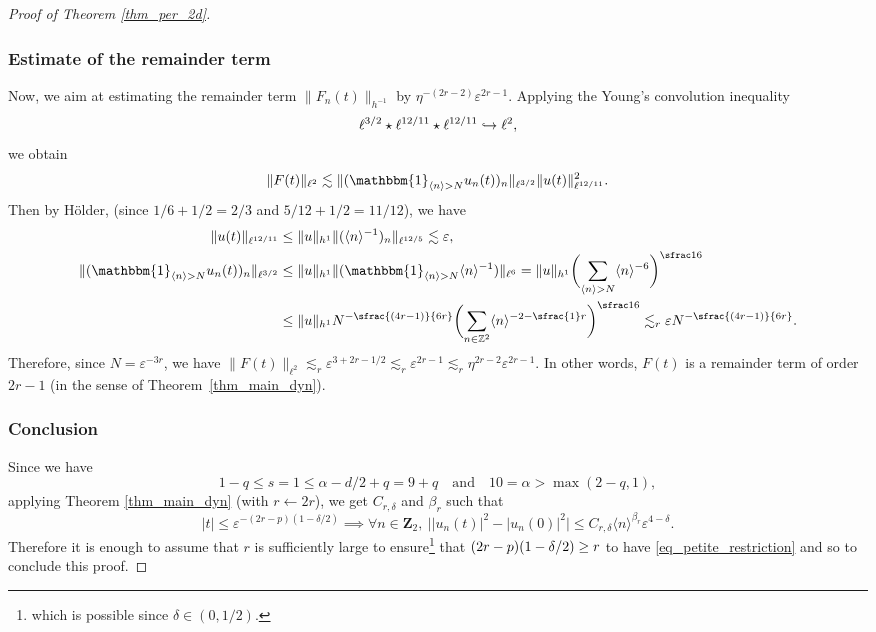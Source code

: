 \documentclass[JEP,XML,SOM,Unicode,NoEqCountersInSection,published]{cedram}
\newcommand\hto{\mathrel{\lhook\joinrel\to}}
\newcommand{\psfrac}[2]{\sfrac{(#1)}{#2}}
\theoremstyle{definition}
\begin{document}
\begin{proof}[Proof of Theorem \ref{thm_per_2d}]
\subsubsection*{Estimate of the remainder term}
Now, we aim at estimating the remainder term $\|F_n(t)\|_{h^{-1}}$ by $\eta^{-(2r-2)} \varepsilon^{ 2r-1}$. Applying the Young's convolution inequality
\[
\ell^{3/2} \star \ell^{12/11} \star \ell^{12/11} \hto \ell^2,
\]
we obtain
\[
\| F(t)\|_{\ell^2}\lesssim \| (\mathbbm{1}_{\langle n \rangle > N} u_n(t))_n \|_{\ell^{3/2}} \| u(t) \|_{\ell^{12/11}}^2.
\]
Then by Hölder, (since $1/6+1/2=2/3$ and $5/12 + 1/2= 11/12$), we have
\begin{align*}
\| u(t) \|_{\ell^{12/11}} &\leq \|u\|_{h^1} \| (\langle n \rangle^{-1})_n \|_{\ell^{12/5}} \lesssim \varepsilon,
\\
\| (\mathbbm{1}_{\langle n \rangle > N} u_n(t))_n \|_{\ell^{3/2}} &\leq \|u\|_{h^1} \| (\mathbbm{1}_{\langle n \rangle > N} \langle n \rangle^{-1}) \|_{\ell^6} = \|u\|_{h^1} \biggl(\sum_{ \langle n \rangle > N } \langle n \rangle^{-6} \biggr)^{\sfrac16} \\
&\leq \|u\|_{h^1} N^{- \psfrac{4r-1}{6r}} \biggl(\sum_{ n\in \mathbb{Z}^2 } \langle n \rangle^{-2-\sfrac{1}r} \biggr)^{\sfrac16} \lesssim_r \varepsilon N^{- \psfrac{4r-1}{6r}}.
\end{align*}
Therefore, since $N=\varepsilon^{-3r}$, we have $\| F(t)\|_{\ell^2} \lesssim_r \varepsilon^{3+2r - 1/2} \lesssim_r \varepsilon^{ 2r-1} \lesssim_r \eta^{2r-2} \varepsilon^{ 2r-1}$. In other words, $F(t)$ is a remainder term of order $2r-1$ (in the sense of Theorem~\ref{thm_main_dyn}).

\subsubsection*{Conclusion}
Since we have
\[
1 - q\leq s=1 \leq \alpha - d/2 +q =9+q \quad\text{and}\quad 10=\alpha > \max(2-q,1),
\]
applying Theorem \ref{thm_main_dyn} (with $r\leftarrow 2r$), we get $C_{r,\delta}$ and $\beta_r$ such that
\[
|t| \leq \varepsilon^{-(2r-p)(1-\delta/2)} \implies \forall n \in \mathbf{Z}_2, \ \bigl||u_n(t)|^2 - |u_n(0)|^2 \bigr| \leq C_{r,\delta} \langle n \rangle^{\beta_r} \varepsilon^{4-\delta}.
\]
Therefore it is enough to assume that $r$ is sufficiently large to ensure\footnote{which is possible since $\delta \in (0,1/2)$.} that $(2r-\nobreak p)(1-\nobreak\delta/2) \geq r $ to have \eqref{eq_petite_restriction} and so to conclude this proof.
\end{proof}
\end{document}
